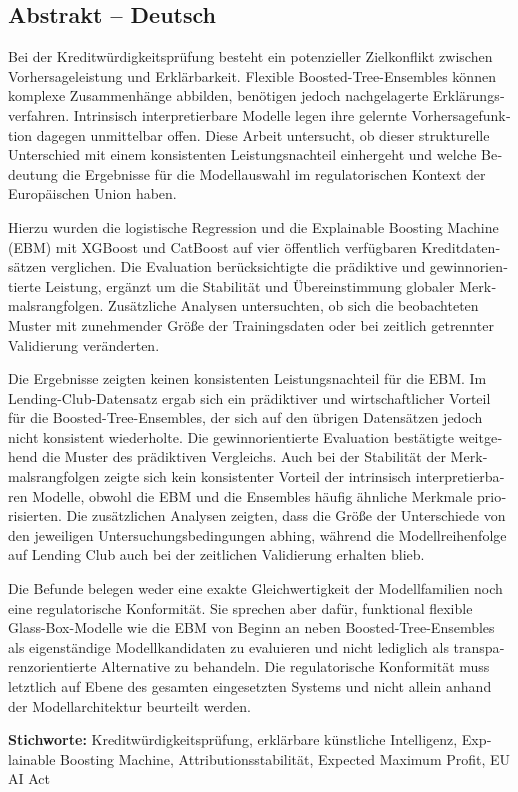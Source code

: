 \begin{otherlanguage}{ngerman}

\section*{Abstrakt -- Deutsch}

Bei der Kreditwürdigkeitsprüfung besteht ein potenzieller Zielkonflikt zwischen Vorhersageleistung und Erklärbarkeit. Flexible Boosted-Tree-Ensembles können komplexe Zusammenhänge abbilden, benötigen jedoch nachgelagerte Erklärungsverfahren. Intrinsisch interpretierbare Modelle legen ihre gelernte Vorhersagefunktion dagegen unmittelbar offen. Diese Arbeit untersucht, ob dieser strukturelle Unterschied mit einem konsistenten Leistungsnachteil einhergeht und welche Bedeutung die Ergebnisse für die Modellauswahl im regulatorischen Kontext der Europäischen Union haben.

Hierzu wurden die logistische Regression und die Explainable Boosting Machine (EBM) mit XGBoost und CatBoost auf vier öffentlich verfügbaren Kreditdatensätzen verglichen. Die Evaluation berücksichtigte die prädiktive und gewinnorientierte Leistung, ergänzt um die Stabilität und Übereinstimmung globaler Merkmalsrangfolgen. Zusätzliche Analysen untersuchten, ob sich die beobachteten Muster mit zunehmender Größe der Trainingsdaten oder bei zeitlich getrennter Validierung veränderten.

Die Ergebnisse zeigten keinen konsistenten Leistungsnachteil für die EBM. Im Lending-Club-Datensatz ergab sich ein prädiktiver und wirtschaftlicher Vorteil für die Boosted-Tree-Ensembles, der sich auf den übrigen Datensätzen jedoch nicht konsistent wiederholte. Die gewinnorientierte Evaluation bestätigte weitgehend die Muster des prädiktiven Vergleichs. Auch bei der Stabilität der Merkmalsrangfolgen zeigte sich kein konsistenter Vorteil der intrinsisch interpretierbaren Modelle, obwohl die EBM und die Ensembles häufig ähnliche Merkmale priorisierten. Die zusätzlichen Analysen zeigten, dass die Größe der Unterschiede von den jeweiligen Untersuchungsbedingungen abhing, während die Modellreihenfolge auf Lending Club auch bei der zeitlichen Validierung erhalten blieb.

Die Befunde belegen weder eine exakte Gleichwertigkeit der Modellfamilien noch eine regulatorische Konformität. Sie sprechen aber dafür, funktional flexible Glass-Box-Modelle wie die EBM von Beginn an neben Boosted-Tree-Ensembles als eigenständige Modellkandidaten zu evaluieren und nicht lediglich als transparenzorientierte Alternative zu behandeln. Die regulatorische Konformität muss letztlich auf Ebene des gesamten eingesetzten Systems und nicht allein anhand der Modellarchitektur beurteilt werden.

\textbf{Stichworte:} Kreditwürdigkeitsprüfung, erklärbare künstliche Intelligenz, Explainable Boosting Machine, Attributionsstabilität, Expected Maximum Profit, EU AI Act


\end{otherlanguage}

